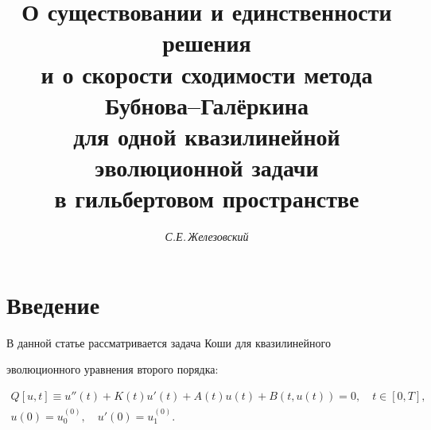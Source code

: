 



\author{\it С.Е.\,Железовский} 




\title{О существовании и единственности решения\\ 


и о скорости сходимости метода Бубнова--Гал\"еркина\\ 


для одной квазилинейной эволюционной задачи\\ 


в гильбертовом пространстве} 


 


\date{} 




 


\pagestyle{plain} %


 


 




 


\maketitle 


\label{begin} 


 


\section{Введение} 


 


В данной статье рассматривается задача Коши для квазилинейного 


эволюционного уравнения второго порядка:


\begin{gather} 


Q[u,t]\equiv u''(t)+K(t)u'(t)+A(t)u(t)+B(t,u(t))=0,\quad 


t\in[0,T], \\ 


u(0)=u^{(0)}_0,\quad u'(0)=u^{(0)}_1. 


\end{gather} 


